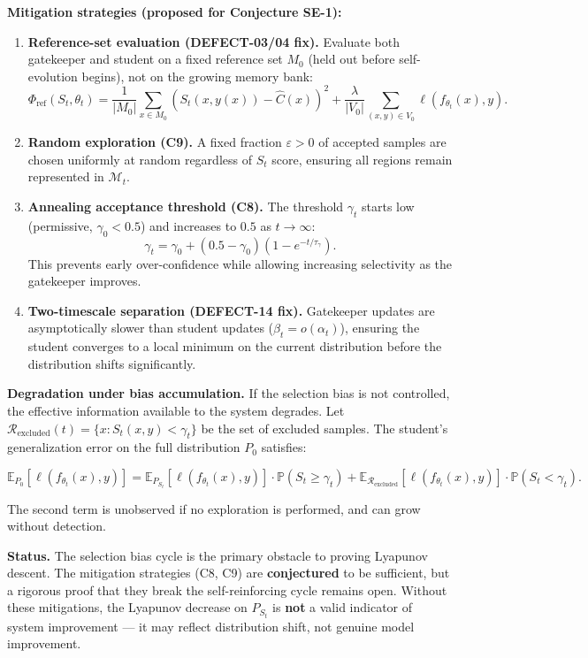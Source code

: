 \documentclass[
  12pt,
]{article}
\begin{document}
\textbf{Mitigation strategies (proposed for Conjecture SE-1):}

\begin{enumerate}
\def\labelenumi{\arabic{enumi}.}
\item
  \textbf{Reference-set evaluation (DEFECT-03/04 fix).} Evaluate both
  gatekeeper and student on a fixed reference set \(M_0\) (held out
  before self-evolution begins), not on the growing memory bank:
  \[\Phi_{\text{ref}}(S_t, \theta_t) = \frac{1}{|M_0|} \sum_{x \in M_0} (S_t(x,y(x)) - \hat{C}(x))^2 + \frac{\lambda}{|V_0|} \sum_{(x,y) \in V_0} \ell(f_{\theta_t}(x), y).\]
\item
  \textbf{Random exploration (C9).} A fixed fraction \(\varepsilon > 0\)
  of accepted samples are chosen uniformly at random regardless of
  \(S_t\) score, ensuring all regions remain represented in
  \(\mathcal{M}_t\).
\item
  \textbf{Annealing acceptance threshold (C8).} The threshold
  \(\gamma_t\) starts low (permissive, \(\gamma_0 < 0.5\)) and increases
  to \(0.5\) as \(t \to \infty\):
  \[\gamma_t = \gamma_0 + (0.5 - \gamma_0)(1 - e^{-t/\tau_\gamma}).\]
  This prevents early over-confidence while allowing increasing
  selectivity as the gatekeeper improves.
\item
  \textbf{Two-timescale separation (DEFECT-14 fix).} Gatekeeper updates
  are asymptotically slower than student updates
  (\(\beta_t = o(\alpha_t)\)), ensuring the student converges to a local
  minimum on the current distribution before the distribution shifts
  significantly.
\end{enumerate}

\textbf{Degradation under bias accumulation.} If the selection bias is
not controlled, the effective information available to the system
degrades. Let
\(\mathcal{R}_{\text{excluded}}(t) = \{x : S_t(x,y) < \gamma_t\}\) be
the set of excluded samples. The student's generalization error on the
full distribution \(P_0\) satisfies:

\[\mathbb{E}_{P_0}[\ell(f_{\theta_t}(x), y)] = \mathbb{E}_{P_{S_t}}[\ell(f_{\theta_t}(x), y)] \cdot \mathbb{P}(S_t \geq \gamma_t) + \mathbb{E}_{\mathcal{R}_{\text{excluded}}}[\ell(f_{\theta_t}(x), y)] \cdot \mathbb{P}(S_t < \gamma_t).\]

The second term is unobserved if no exploration is performed, and can
grow without detection.

\textbf{Status.} The selection bias cycle is the primary obstacle to
proving Lyapunov descent. The mitigation strategies (C8, C9) are
\textbf{conjectured} to be sufficient, but a rigorous proof that they
break the self-reinforcing cycle remains open. Without these
mitigations, the Lyapunov decrease on \(P_{S_t}\) is \textbf{not} a
valid indicator of system improvement --- it may reflect distribution
shift, not genuine model improvement.
\end{document}
